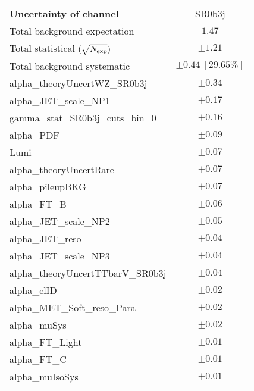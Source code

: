\begin{table}
\begin{center}
\setlength{\tabcolsep}{0.0pc}
\begin{tabular*}{\textwidth}{@{\extracolsep{\fill}}lc}
\noalign{\smallskip}\hline\noalign{\smallskip}
{\bf Uncertainty of channel}                                    & SR0b3j            \\
\noalign{\smallskip}\hline\noalign{\smallskip}
Total background expectation             &  $1.47$       \\
\noalign{\smallskip}\hline\noalign{\smallskip}
Total statistical $(\sqrt{N_{\rm exp}})$              & $\pm 1.21$       \\
Total background systematic               & $\pm 0.44\ [29.65\%] $             \\
\noalign{\smallskip}\hline\noalign{\smallskip}
\noalign{\smallskip}\hline\noalign{\smallskip}
alpha\_theoryUncertWZ\_SR0b3j         & $\pm 0.34$       \\
alpha\_JET\_scale\_NP1         & $\pm 0.17$       \\
gamma\_stat\_SR0b3j\_cuts\_bin\_0         & $\pm 0.16$       \\
alpha\_PDF         & $\pm 0.09$       \\
Lumi         & $\pm 0.07$       \\
alpha\_theoryUncertRare         & $\pm 0.07$       \\
alpha\_pileupBKG         & $\pm 0.07$       \\
alpha\_FT\_B         & $\pm 0.06$       \\
alpha\_JET\_scale\_NP2         & $\pm 0.05$       \\
alpha\_JET\_reso         & $\pm 0.04$       \\
alpha\_JET\_scale\_NP3         & $\pm 0.04$       \\
alpha\_theoryUncertTTbarV\_SR0b3j         & $\pm 0.04$       \\
alpha\_elID         & $\pm 0.02$       \\
alpha\_MET\_Soft\_reso\_Para         & $\pm 0.02$       \\
alpha\_muSys         & $\pm 0.02$       \\
alpha\_FT\_Light         & $\pm 0.01$       \\
alpha\_FT\_C         & $\pm 0.01$       \\
alpha\_muIsoSys         & $\pm 0.01$       \\

\end{tabular*}
\end{center}
\end{table}
